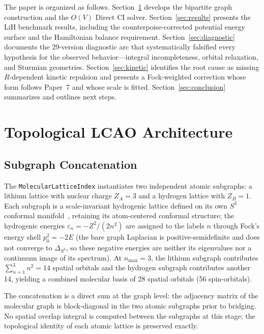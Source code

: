 \documentclass[aps,pra,twocolumn,superscriptaddress,longbibliography]{revtex4-2}
\begin{document}
The paper is organized as follows.  Section~\ref{sec:architecture}
develops the bipartite graph construction and the $O(V)$ Direct CI
solver.  Section~\ref{sec:results} presents the LiH benchmark results,
including the counterpoise-corrected potential energy surface and the
Hamiltonian balance requirement.
Section~\ref{sec:diagnostic} documents the 29-version diagnostic arc
that systematically falsified every hypothesis for the observed
behavior---integral incompleteness, orbital
relaxation, and Sturmian geometries.
Section~\ref{sec:kinetic} identifies the root cause as missing
$R$-dependent kinetic repulsion and presents a Fock-weighted correction
whose form follows Paper~7 and whose scale is fitted.
Section~\ref{sec:conclusion} summarizes and outlines next steps.

\section{Topological LCAO Architecture}
\label{sec:architecture}

\subsection{Subgraph Concatenation}
\label{sec:subgraph}

The \texttt{MolecularLatticeIndex} instantiates two independent atomic
subgraphs: a lithium lattice with nuclear charge $Z_A=3$ and a hydrogen
lattice with $Z_B=1$.  Each subgraph is a scale-invariant hydrogenic
lattice defined on its own $S^3$ conformal manifold~\cite{paper7},
retaining its atom-centered conformal structure; the hydrogenic energies
$\varepsilon_{n} = -Z^2/(2n^2)$ are assigned to the labels $n$ through
Fock's energy shell $p_0^2 = -2E$ (the bare graph Laplacian is
positive-semidefinite and does not converge to $\Delta_{S^3}$, so these
negative energies are neither its eigenvalues nor a continuum image of
its spectrum).  At $n_{\max}=3$, the lithium
subgraph contributes $\sum_{n=1}^{3}n^2 = 14$ spatial orbitals and the
hydrogen subgraph contributes another 14, yielding a combined molecular
basis of 28 spatial orbitals (56 spin-orbitals).

The concatenation is a direct sum at the graph level: the adjacency
matrix of the molecular graph is block-diagonal in the two atomic
subgraphs prior to bridging.  No spatial overlap integral is computed
between the subgraphs at this stage; the topological identity of each
atomic lattice is preserved exactly.
\end{document}
